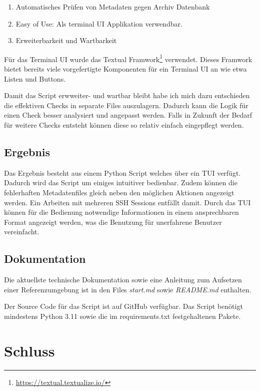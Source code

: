 \documentclass[a4paper,oneside, 12pt]{report}
\begin{document}
\begin{enumerate}
  \item Automatisches Prüfen von Metadaten gegen Archiv Datenbank
  \item Easy of Use: Als terminal UI Applikation verwendbar.
  \item Erweiterbarkeit und Wartbarkeit
\end{enumerate}

Für das Terminal UI wurde das Textual Framwork\footnote{\url{https://textual.textualize.io/}}  verwendet. Dieses Framwork bietet bereits viele vorgefertigte Komponenten für ein Terminal UI an wie etwa Listen und Buttons.

Damit das Script erwweiter- und wartbar bleibt habe ich mich dazu entschieden die effektiven Checks in separate Files auszulagern. Dadurch kann die Logik für einen Check besser analysiert und angepasst werden. Falls in Zukunft der Bedarf für weitere Checks entsteht können diese so relativ einfach eingepflegt werden.



\section{Ergebnis}
Das Ergebnis besteht aus einem Python Script welches über ein \ac{TUI} verfügt. Dadurch wird das Script um einiges intuitiver bedienbar. Zudem können die fehlerhaften Metadatenfiles gleich neben den möglichen Aktionen angezeigt werden. Ein Arbeiten mit mehreren SSH Sessions entfällt damit. Durch das \ac{TUI} können für die Bedienung notwendige Informationen in einem ansprechbaren Format angezeigt werden, was die Benutzung für unerfahrene Benutzer vereinfacht.

\section{Dokumentation}
Die aktuellste technische Dokumentation sowie eine Anleitung zum Aufsetzen einer Referenzumgebung ist in den Files \textit{start.md} sowie \textit{README.md} enthalten.

Der Source Code für das Script ist auf GitHub verfügbar. Das Script benötigt mindestens Python 3.11 sowie die im requirements.txt festgehaltenen Pakete. 


\chapter{Schluss}\label{sec:schluss}
\end{document}
